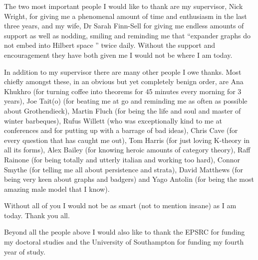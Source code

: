 \documentclass[11pt,a4paper,openright]{amsbook}
\theoremstyle{plain}
\theoremstyle{definition}%
\theoremstyle{remark}%
\begin{document}
The two most important people I would like to thank are my supervisor, Nick Wright, for giving me a phenomenal amount of time and enthusiasm in the last three years, and my wife, Dr Sarah Finn-Sell for giving me endless amounts of support as well as nodding, smiling and reminding me that ``expander graphs do not embed into Hilbert space '' twice daily.  Without the support and encouragement they have both given me I would not be where I am today.

In addition to my supervisor there are many other people I owe thanks. Most chiefly amongst these, in an obvious but yet completely benign order, are Ana Khukhro (for turning coffee into theorems for 45 minutes every morning for 3 years), Joe Tait(o) (for beating me at go and reminding me as often as possible about Grothendieck), Martin Fluch (for being the life and soul and master of winter barbeques), Rufus Willett (who was exceptionally kind to me at conferences and for putting up with a barrage of bad ideas), Chris Cave (for every question that has caught me out), Tom Harris (for just loving K-theory in all its forms), Alex Bailey (for knowing heroic amounts of category theory), Raff Rainone (for being totally and utterly italian and working too hard), Connor Smythe (for telling me all about persistence and strata), David Matthews (for being very keen about graphs and badgers) and Yago Antolin (for being the most amazing male model that I know).

Without all of you I would not be as smart (not to mention insane) as I am today. Thank you all.

Beyond all the people above I would also like to thank the EPSRC for funding my doctoral studies and the University of Southampton for funding my fourth year of study.


\mainmatter







\end{document}
